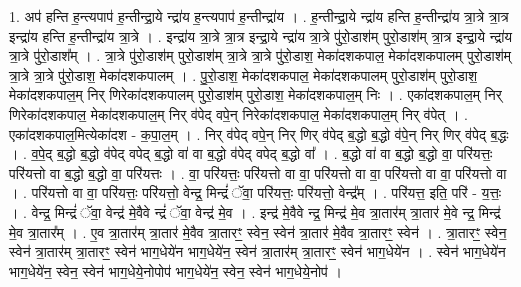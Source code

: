 \documentclass[17pt]{extarticle}
\begin{document}
1. अप॑ हन्ति ह॒न्त्यपाप॑ ह॒न्तीन्द्रा॒ये न्द्रा॑य ह॒न्त्यपाप॑ ह॒न्तीन्द्रा॑य । . ह॒न्तीन्द्रा॒ये न्द्रा॑य हन्ति ह॒न्तीन्द्रा॑य त्रा॒त्रे त्रा॒त्र इन्द्रा॑य हन्ति ह॒न्तीन्द्रा॑य त्रा॒त्रे । . इन्द्रा॑य त्रा॒त्रे त्रा॒त्र इन्द्रा॒ये न्द्रा॑य त्रा॒त्रे पु॑रो॒डाश॑म् पुरो॒डाश॑म् त्रा॒त्र इन्द्रा॒ये न्द्रा॑य त्रा॒त्रे पु॑रो॒डाश᳚म् । . त्रा॒त्रे पु॑रो॒डाश॑म् पुरो॒डाश॑म् त्रा॒त्रे त्रा॒त्रे पु॑रो॒डाश॒ मेका॑दशकपाल॒ मेका॑दशकपालम् पुरो॒डाश॑म् त्रा॒त्रे त्रा॒त्रे पु॑रो॒डाश॒ मेका॑दशकपालम् । . पु॒रो॒डाश॒ मेका॑दशकपाल॒ मेका॑दशकपालम् पुरो॒डाश॑म् पुरो॒डाश॒ मेका॑दशकपाल॒म् निर् णिरेका॑दशकपालम् पुरो॒डाश॑म् पुरो॒डाश॒ मेका॑दशकपाल॒म् निः । . एका॑दशकपाल॒म् निर् णिरेका॑दशकपाल॒ मेका॑दशकपाल॒म् निर् व॑पेद् वपे॒न् निरेका॑दशकपाल॒ मेका॑दशकपाल॒म् निर् व॑पेत् । . एका॑दशकपाल॒मित्येका॑दश - क॒पा॒ल॒म् । . निर् व॑पेद् वपे॒न् निर् णिर् व॑पेद् ब॒द्धो ब॒द्धो व॑पे॒न् निर् णिर् व॑पेद् ब॒द्धः । . व॒पे॒द् ब॒द्धो ब॒द्धो व॑पेद् वपेद् ब॒द्धो वा॑ वा ब॒द्धो व॑पेद् वपेद् ब॒द्धो वा᳚ । . ब॒द्धो वा॑ वा ब॒द्धो ब॒द्धो वा॒ परि॑यत्तः॒ परि॑यत्तो वा ब॒द्धो ब॒द्धो वा॒ परि॑यत्तः । . वा॒ परि॑यत्तः॒ परि॑यत्तो वा वा॒ परि॑यत्तो वा वा॒ परि॑यत्तो वा वा॒ परि॑यत्तो वा । . परि॑यत्तो वा वा॒ परि॑यत्तः॒ परि॑यत्तो॒ वेन्द्र॒ मिन्द्रं॑ ॅवा॒ परि॑यत्तः॒ परि॑यत्तो॒ वेन्द्र᳚म् । . परि॑यत्त॒ इति॒ परि॑ - य॒त्तः॒ । . वेन्द्र॒ मिन्द्रं॑ ॅवा॒ वेन्द्र॑ मे॒वैवे न्द्रं॑ ॅवा॒ वेन्द्र॑ मे॒व । . इन्द्र॑ मे॒वैवे न्द्र॒ मिन्द्र॑ मे॒व त्रा॒तार॑म् त्रा॒तार॑ मे॒वे न्द्र॒ मिन्द्र॑ मे॒व त्रा॒तार᳚म् । . ए॒व त्रा॒तार॑म् त्रा॒तार॑ मे॒वैव त्रा॒तारꣳ॒॒ स्वेन॒ स्वेन॑ त्रा॒तार॑ मे॒वैव त्रा॒तारꣳ॒॒ स्वेन॑ । . त्रा॒तारꣳ॒॒ स्वेन॒ स्वेन॑ त्रा॒तार॑म् त्रा॒तारꣳ॒॒ स्वेन॑ भाग॒धेये॑न भाग॒धेये॑न॒ स्वेन॑ त्रा॒तार॑म् त्रा॒तारꣳ॒॒ स्वेन॑ भाग॒धेये॑न । . स्वेन॑ भाग॒धेये॑न भाग॒धेये॑न॒ स्वेन॒ स्वेन॑ भाग॒धेये॒नोपोप॑ भाग॒धेये॑न॒ स्वेन॒ स्वेन॑ भाग॒धेये॒नोप॑ । \newline
\end{document}
